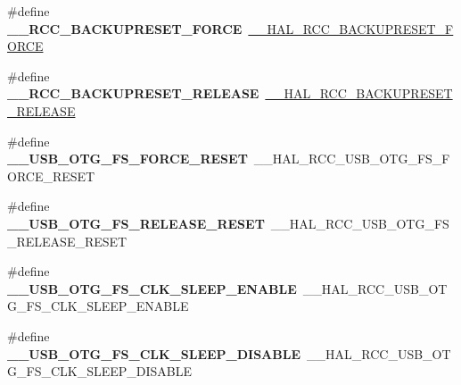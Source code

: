 \begin{DoxyCompactItemize}
\#define {\bfseries \+\_\+\+\_\+\+R\+C\+C\+\_\+\+B\+A\+C\+K\+U\+P\+R\+E\+S\+E\+T\+\_\+\+F\+O\+R\+CE}~\hyperlink{group___r_c_c___r_t_c___clock___configuration_ga3bf7da608ff985873ca8e248fb1dc4f0}{\+\_\+\+\_\+\+H\+A\+L\+\_\+\+R\+C\+C\+\_\+\+B\+A\+C\+K\+U\+P\+R\+E\+S\+E\+T\+\_\+\+F\+O\+R\+CE}
\item 
\mbox{\label{group___h_a_l___r_c_c___aliased_ga16e2165e9541a9ffbf34614eb6ef91c2}} 
\#define {\bfseries \+\_\+\+\_\+\+R\+C\+C\+\_\+\+B\+A\+C\+K\+U\+P\+R\+E\+S\+E\+T\+\_\+\+R\+E\+L\+E\+A\+SE}~\hyperlink{group___r_c_c___r_t_c___clock___configuration_ga14f32622c65f4ae239ba8cb00d510321}{\+\_\+\+\_\+\+H\+A\+L\+\_\+\+R\+C\+C\+\_\+\+B\+A\+C\+K\+U\+P\+R\+E\+S\+E\+T\+\_\+\+R\+E\+L\+E\+A\+SE}
\item 
\mbox{\label{group___h_a_l___r_c_c___aliased_ga4cbf3d0cd9c1f29b7f38cd672a7f81a3}} 
\#define {\bfseries \+\_\+\+\_\+\+U\+S\+B\+\_\+\+O\+T\+G\+\_\+\+F\+S\+\_\+\+F\+O\+R\+C\+E\+\_\+\+R\+E\+S\+ET}~\+\_\+\+\_\+\+H\+A\+L\+\_\+\+R\+C\+C\+\_\+\+U\+S\+B\+\_\+\+O\+T\+G\+\_\+\+F\+S\+\_\+\+F\+O\+R\+C\+E\+\_\+\+R\+E\+S\+ET
\item 
\mbox{\label{group___h_a_l___r_c_c___aliased_ga0c1425084511fd2205b412ee47165041}} 
\#define {\bfseries \+\_\+\+\_\+\+U\+S\+B\+\_\+\+O\+T\+G\+\_\+\+F\+S\+\_\+\+R\+E\+L\+E\+A\+S\+E\+\_\+\+R\+E\+S\+ET}~\+\_\+\+\_\+\+H\+A\+L\+\_\+\+R\+C\+C\+\_\+\+U\+S\+B\+\_\+\+O\+T\+G\+\_\+\+F\+S\+\_\+\+R\+E\+L\+E\+A\+S\+E\+\_\+\+R\+E\+S\+ET
\item 
\mbox{\label{group___h_a_l___r_c_c___aliased_ga86e49075f8526ea61ca22a6f83ca65d7}} 
\#define {\bfseries \+\_\+\+\_\+\+U\+S\+B\+\_\+\+O\+T\+G\+\_\+\+F\+S\+\_\+\+C\+L\+K\+\_\+\+S\+L\+E\+E\+P\+\_\+\+E\+N\+A\+B\+LE}~\+\_\+\+\_\+\+H\+A\+L\+\_\+\+R\+C\+C\+\_\+\+U\+S\+B\+\_\+\+O\+T\+G\+\_\+\+F\+S\+\_\+\+C\+L\+K\+\_\+\+S\+L\+E\+E\+P\+\_\+\+E\+N\+A\+B\+LE
\item 
\mbox{\label{group___h_a_l___r_c_c___aliased_ga5e698c23794023e6a3bc1d636f969d29}} 
\#define {\bfseries \+\_\+\+\_\+\+U\+S\+B\+\_\+\+O\+T\+G\+\_\+\+F\+S\+\_\+\+C\+L\+K\+\_\+\+S\+L\+E\+E\+P\+\_\+\+D\+I\+S\+A\+B\+LE}~\+\_\+\+\_\+\+H\+A\+L\+\_\+\+R\+C\+C\+\_\+\+U\+S\+B\+\_\+\+O\+T\+G\+\_\+\+F\+S\+\_\+\+C\+L\+K\+\_\+\+S\+L\+E\+E\+P\+\_\+\+D\+I\+S\+A\+B\+LE

\end{DoxyCompactItemize}
